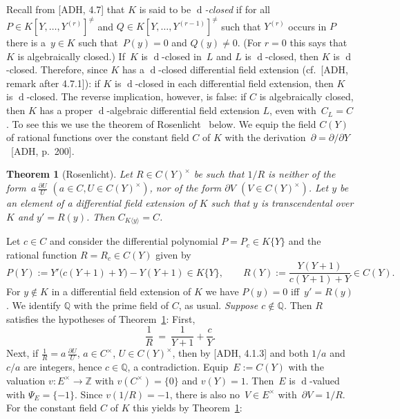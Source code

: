 \documentclass[]{amsart}
\numberwithin{equation}{section}
\newcommand{\bbold}{\mathbb}
\def\Q { {\bbold Q} }
\def\Z { {\bbold Z} }
\def \order{\operatorname{order}}
\def \d{\operatorname{d}}
\def \<{\langle}
\def \>{\rangle}
\newtheorem{theorem}{Theorem}[section]
\theoremstyle{definition}
\theoremstyle{remark}
\begin{document}
\noindent
Recall from [ADH, 4.7]  that $K$ is said to be {\it $\d$-closed}\/ if for all $P\in K[Y,\dots, Y^{(r)}]^{\ne}$ and
$Q\in K[Y,\dots, Y^{(r-1)}]^{\ne}$ such that $Y^{(r)}$ occurs in $P$
there is a~$y\in K$ such that~$P(y)=0$ and $Q(y)\ne 0$. (For $r=0$ this says that $K$ is algebraically closed.) 
If~$K$ is $\d$-closed in~$L$ and $L$ is $\d$-closed, then $K$ is $\d$-closed. Therefore, since
  $K$ has a $\d$-closed differential field extension
(cf.~[ADH, remark after 4.7.1]): if $K$ is $\d$-closed in each  differential field extension, then $K$ is $\d$-closed.
The reverse implication, however, is false:
if $C$ is algebraically closed,
then $K$ has a proper $\d$-algebraic differential field extension $L$, even with~${C_L=C}$. To see this we use the 
theorem of Rosenlicht~\cite[Proposition~2]{Rosenlicht74} below.  We equip the field $C(Y)$ of rational functions over the constant field $C$ of $K$ with the derivation~$\partial=\partial/\partial Y$~[ADH, p.~200].
 


\begin{theorem}[Rosenlicht]\label{thm:RosenlichtOrder1}
Let $R\in C(Y)^\times$ be such that $1/R$ is neither of the form~$a\,\frac{\partial U}{U}$ $(a\in C, U\in C(Y)^\times)$, nor of the form
$\partial V$ $(V\in C(Y)^\times)$.
Let $y$ be an element of a differential field extension of $K$ such that $y$ is transcendental over $K$ and $y'=R(y)$.   Then $C_{K\<y\>}=C$.
\end{theorem}

\noindent
 Let $c\in C$ and consider the differential polynomial $P=P_c\in K\{Y\}$ and the rational function $R=R_c\in C(Y)$ given by 
$$P(Y) := Y'\big( c(Y+1)+Y \big) - Y(Y+1)\in K\{Y\},\qquad R(Y):=\frac{Y(Y+1)}{c(Y+1)+Y}\in C(Y).$$
For $y\notin K$ in a differential field extension of $K$  we have $P(y)=0$ iff~${y'=R(y)}$.
We identify $\Q$ with the prime field of $C$, as usual. {\it Suppose $c\notin\Q$.}\/ Then $R$ satisfies the hypotheses of Theorem~\ref{thm:RosenlichtOrder1}: First, 
$$\frac{1}{R}\  =\  \frac{1}{Y+1}+\frac{c}{Y}.$$
Next, if $\frac{1}{R} = a\,\frac{\partial U}{U}$, $a\in C^\times$, $U\in C(Y)^\times$,
then by [ADH, 4.1.3] and \cite[Chapter~V, Theorem~5.2]{Lang} both $1/a$ and~$c/a$ are integers, hence
$c\in\Q$, a contradiction.  
Equip~$E:=C(Y)$ with  
the valuation $v\colon E^\times\to\Z$ with $v(C^\times)=\{0\}$ and $v(Y)=1$. Then~$E$ 
is  $\d$-valued   with $\Psi_E=\{-1\}$. Since $v(1/R)=-1$, there is also no~$V\in E^\times$ with~$\partial V=1/R$. For the constant field $C$ of $K$ this yields by Theorem~\ref{thm:RosenlichtOrder1}:
\end{document}
